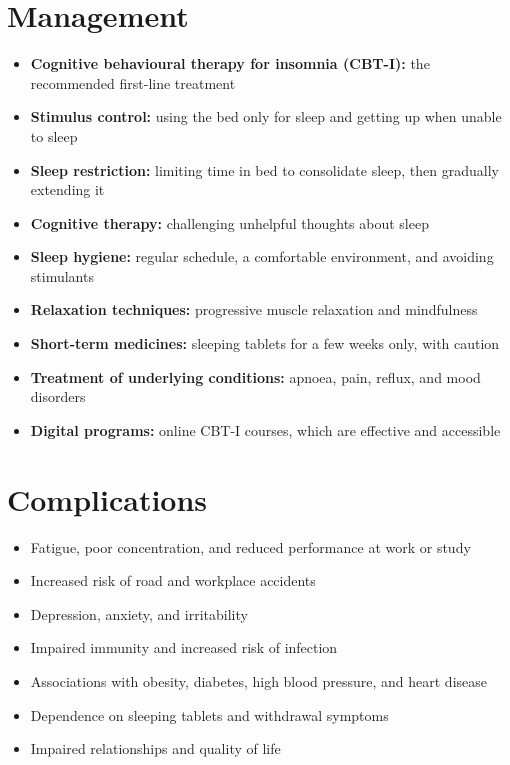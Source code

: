 \section*{Management}
\begin{itemize}
    \item \textbf{Cognitive behavioural therapy for insomnia (CBT-I):} the recommended first-line treatment
    \item \textbf{Stimulus control:} using the bed only for sleep and getting up when unable to sleep
    \item \textbf{Sleep restriction:} limiting time in bed to consolidate sleep, then gradually extending it
    \item \textbf{Cognitive therapy:} challenging unhelpful thoughts about sleep
    \item \textbf{Sleep hygiene:} regular schedule, a comfortable environment, and avoiding stimulants
    \item \textbf{Relaxation techniques:} progressive muscle relaxation and mindfulness
    \item \textbf{Short-term medicines:} sleeping tablets for a few weeks only, with caution
    \item \textbf{Treatment of underlying conditions:} apnoea, pain, reflux, and mood disorders
    \item \textbf{Digital programs:} online CBT-I courses, which are effective and accessible
\end{itemize}

\section*{Complications}
\begin{itemize}
    \item Fatigue, poor concentration, and reduced performance at work or study
    \item Increased risk of road and workplace accidents
    \item Depression, anxiety, and irritability
    \item Impaired immunity and increased risk of infection
    \item Associations with obesity, diabetes, high blood pressure, and heart disease
    \item Dependence on sleeping tablets and withdrawal symptoms
    \item Impaired relationships and quality of life
\end{itemize}

